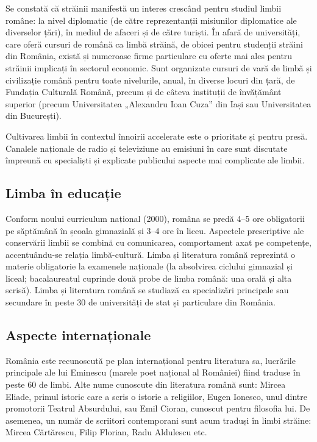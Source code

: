 \begin{multicols}{2}
Se constată că străinii manifestă un interes crescând pentru studiul limbii române: la nivel diplomatic (de către reprezentanții misiunilor diplomatice ale diverselor țări), în mediul de afaceri și de către turiști. În afară de universități, care oferă cursuri de română ca limbă străină, de obicei pentru studenții străini din România, există și numeroase firme particulare cu oferte mai ales pentru străinii implicați în sectorul economic. Sunt organizate cursuri de vară de limbă și civilizație română pentru toate nivelurile, anual, în diverse locuri din țară, de Fundația Culturală Română, precum și de câteva instituții de învățământ superior (precum Universitatea „Alexandru Ioan Cuza” din Iași sau Universitatea din București).

Cultivarea limbii în contextul înnoirii accelerate este o prioritate și pentru presă. Canalele naționale de radio și televiziune au emisiuni în care sunt discutate împreună cu specialiști și explicate publicului aspecte mai complicate ale limbii.

\subsection{Limba în educație}

Conform noului curriculum național (2000), româna se predă 4--5 ore obligatorii pe săptămână în școala gimnazială și 3--4 ore în liceu. Aspectele prescriptive ale conservării limbii se combină cu comunicarea, comportament axat pe competențe, accentuându-se relația limbă-cultură. Limba și literatura română reprezintă o materie obligatorie la examenele naționale (la absolvirea ciclului gimnazial și liceal; bacalaureatul cuprinde două probe de limba română: una orală și alta scrisă).
Limba și literatura română se studiază ca specializări principale sau secundare în peste 30 de universități de stat și particulare din România.

\subsection{Aspecte internaționale}

România este recunoscută pe plan internațional pentru literatura sa, lucrările principale ale lui Eminescu (marele poet național al României) fiind traduse în peste 60 de limbi. Alte nume cunoscute din literatura română sunt: Mircea Eliade, primul istoric care a scris o istorie a religiilor, Eugen Ionesco, unul dintre promotorii Teatrul Absurdului, sau Emil Cioran, cunoscut pentru filosofia lui. De asemenea, un număr de scriitori contemporani sunt acum traduși în limbi străine: Mircea Cărtărescu, Filip Florian, Radu Aldulescu etc.


\end{multicols}
